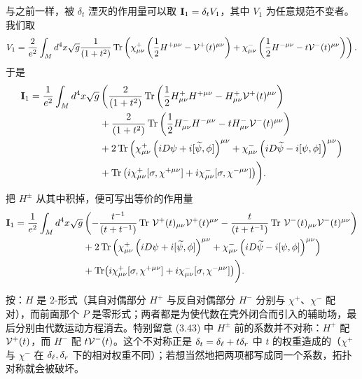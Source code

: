 与之前一样，被 $\delta_t$ 湮灭的作用量可以取 ${{\mathbf{I}}}_1=\delta_t V_1$，其中 $V_1$ 为任意规范不变者。我们取
\setcounter{equation}{42}
\begin{equation}\label{eq:usefuld}
V_1={2\over e^2}\int_Md^4x \sqrt g{1\over
(1+t^2)}\operatorname{Tr}\left(\chi^+_{\mu\nu}\left({1\over
2}H^{+\mu\nu}-{\mathcal{V}}^+(t)^{\mu\nu}\right)
+\chi^-_{\mu\nu}\left({1\over
2}H^{-\mu\nu}-t{\mathcal{V}}^-(t)^{\mu\nu}\right)\right).
\end{equation}
于是
\setcounter{equation}{43}
\begin{equation}\label{eq:usefuldud}
\begin{aligned}{{{{\mathbf{I}}}}}_1= {1\over e^2}\int_Md^4x
\sqrt g&\left({2\over (1+t^2)}\operatorname{Tr}\left({1\over
2}H^+_{\mu\nu}H^{+\mu\nu}-H^+_{\mu\nu}{\mathcal{V}}^+(t)^{\mu\nu}\right)\right.\\
& + {2\over (1+t^2)}\operatorname{Tr}\left({1\over
2}H^-_{\mu\nu}H^{-\mu\nu}-tH^-_{\mu\nu}{\mathcal{V}}^-(t)^{\mu\nu}\right)\\
&+
2\operatorname{Tr}\left(\chi^+_{\mu\nu}\left(iD\psi+i[\widetilde\psi,\phi]\right)^{\mu\nu}
+\chi^-_{\mu\nu}\left(iD\widetilde\psi-i[\psi,\phi]\right)^{\mu\nu}\right)\\
&+\operatorname{Tr}\left(i\chi^+_{\mu\nu}[\sigma,\chi^{+\mu\nu}]+
i\chi^-_{\mu\nu}[\sigma,\chi^{-\mu\nu}] \right)\biggr).\\\end{aligned}
\end{equation}
把 $H^{\pm}$ 从其中积掉，便可写出等价的作用量%
\setcounter{equation}{44}
\begin{equation}\label{eq:usefuldudd}
\begin{aligned}{{{\mathbf{I}}}}_1= {1\over
e^2}\int_Md^4x \sqrt g&\left(-{t^{-1}\over
(t+t^{-1})}\operatorname{Tr}\,{\mathcal{V}}^+(t)_{\mu\nu}{\mathcal{V}}^+(t)^{\mu\nu}-{t\over
(t+t^{-1})}\operatorname{Tr}\,{\mathcal{V}}^-(t)_{\mu\nu}{\mathcal{V}}^-(t)^{\mu\nu}\right)\\ &+
2\operatorname{Tr}\left(\chi^+_{\mu\nu}\left(iD\psi+i[\widetilde\psi,\phi]\right)^{\mu\nu}
+\chi^-_{\mu\nu}\left(iD\widetilde\psi-i[\psi,\phi]\right)^{\mu\nu}\right)\\
&+\operatorname{Tr}\bigl(i\chi^+_{\mu\nu}[\sigma,\chi^{+\mu\nu}]+
i\chi^-_{\mu\nu}[\sigma,\chi^{-\mu\nu}] \bigr)\biggr).\\\end{aligned}
\end{equation}

\begin{yizhu}[易错点]
按：$H$ 是 2-形式（其自对偶部分 $H^+$ 与反自对偶部分 $H^-$ 分别与 $\chi^+$、$\chi^-$ 配对），而前面那个 $P$ 是零形式；两者都是为使代数在壳外闭合而引入的辅助场，最后分别由代数运动方程消去。特别留意 (3.43) 中 $H^\pm$ 前的系数并不对称：$H^+$ 配 ${\mathcal{V}}^+(t)$，而 $H^-$ 配 $t{\mathcal{V}}^-(t)$。这个不对称正是 $\delta_t=\delta_\ell+t\delta_r$ 中 $t$ 的权重造成的（$\chi^+$ 与 $\chi^-$ 在 $\delta_\ell,\delta_r$ 下的相对权重不同）；若想当然地把两项都写成同一个系数，拓扑对称就会被破坏。
\end{yizhu}

